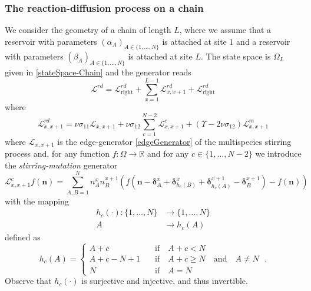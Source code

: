 \documentclass[10pt]{article}
\numberwithin{equation}{section}
\numberwithin{equation}{subsection}
\newcommand{\dt}{\;.}
\begin{document}
{\subsubsection{The reaction-diffusion process on a chain}
We consider the geometry of a chain of length $L$, where we assume that a reservoir with parameters $(\alpha_{A})_{A\in\{1,\ldots,N\}}$ is attached at site $1$ and a reservoir with parameters $(\beta_{A})_{A\in\{1,\ldots,N\}}$ is attached at site $L$. The state space is $\Omega_{L}$ given in \eqref{stateSpace-Chain} and the generator reads
\begin{equation}\label{RDGenerator}
	\mathcal{L}^{rd}=\mathcal{L}_{\text{right}}^{rd}+\sum_{x=1}^{L-1}\mathcal{L}_{x,x+1}^{rd}+\mathcal{L}_{\text{right}}^{rd}
\end{equation}
where
\begin{equation}\label{edgeGeneratorRD}
	\mathcal{L}_{x,x+1}^{rd}=\nu \sigma_{11}\mathcal{L}_{x,x+1}+\nu \sigma_{12}\sum_{c=1}^{N-2}\mathcal{L}_{x,x+1}^{c}+(\Upsilon-2\nu\sigma_{12})\mathcal{L}_{x,x+1}^{m}
\end{equation}
where $\mathcal{L}_{x,x+1}$ is the edge-generator \eqref{edgeGenerator} of the multispecies stirring process and, for any function $f:\Omega\to \mathbb{R}$ and for any $c\in \{1,\ldots,N-2\}$ we introduce the \textit{stirring-mutation} generator
\begin{equation}
	\mathcal{L}_{x,x+1}^{c}f(\bm{n})=\sum_{A,B=1}^{N}n_{A}^{x}n_{B}^{x+1}\left(f(\bm{n}-\bm{\delta}_{A}^{x}+\bm{\delta}_{h_{c}(B)}^{x}+\bm{\delta}_{h_{c}(A)}^{x+1}-\bm{\delta}_{B}^{x+1})-f(\bm{n})\right)
\end{equation}
with the mapping 
\begin{equation}
	\begin{split}
		h_{c}(\cdot):\{1,\ldots,N\}&\to\{1,\ldots,N\}\\
		A&\to h_{c}(A)
	\end{split}
\end{equation}
defined as
\begin{equation}
	h_{c}(A)=\begin{cases}
		A+c \quad &\text{if}\quad A+c< N \\
		A+c-N+1\quad &\text{if}\quad A+c\geq N\quad \text{and}\quad A\neq N\\
		N\quad &\text{if}\quad A=N
	\end{cases}\dt
\end{equation}
Observe that $h_{c}(\cdot)$ is surjective and injective, and thus invertible. 

}
\end{document}
